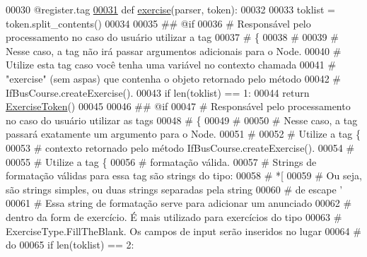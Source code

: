 \begin{DoxyCode}
{{00030 @register.tag
\hypertarget{exercises_8py_source_l00031}{}\hyperlink{namespaceCourse_1_1templatetags_1_1exercises_a8c8aa0687de6cfe821c8acaecafba711}{00031} \textcolor{keyword}{def }\hyperlink{namespaceCourse_1_1templatetags_1_1exercises_a8c8aa0687de6cfe821c8acaecafba711}{exercise}(parser, token):
00032 
00033     toklist = token.split\_contents()
00034 
00035     \textcolor{comment}{## @if}
00036     \textcolor{comment}{#   Responsável pelo processamento no caso do usuário utilizar a tag}
00037     \textcolor{comment}{# \{%
00038     \textcolor{comment}{#}
00039     \textcolor{comment}{#   Nesse caso, a tag não irá passar argumentos adicionais para o Node.}
00040     \textcolor{comment}{#   Utilize esta tag caso você tenha uma variável no contexto chamada}
00041     \textcolor{comment}{#   "exercise" (sem aspas) que contenha o objeto retornado pelo método}
00042     \textcolor{comment}{#   IfBusCourse.createExercise().}
00043     \textcolor{keywordflow}{if} len(toklist) == 1:
00044         \textcolor{keywordflow}{return} \hyperlink{classCourse_1_1templatetags_1_1exercises_1_1ExerciseToken}{ExerciseToken}()
00045 
00046     \textcolor{comment}{## @if}
00047     \textcolor{comment}{#   Responsável pelo processamento no caso do usuário utilizar as tags}
00048     \textcolor{comment}{# \{%
00049     \textcolor{comment}{#}
00050     \textcolor{comment}{#   Nesse caso, a tag passará exatamente um argumento para o Node.}
00051     \textcolor{comment}{#}
00052     \textcolor{comment}{#   Utilize a tag \{%
00053     \textcolor{comment}{# contexto retornado pelo método IfBusCourse.createExercise().}
00054     \textcolor{comment}{#}
00055     \textcolor{comment}{#   Utilize a tag \{%
00056     \textcolor{comment}{# formatação válida.}
00057     \textcolor{comment}{#   Strings de formatação válidas para essa tag são strings do tipo:}
00058     \textcolor{comment}{#       *[%
00059     \textcolor{comment}{#   Ou seja, são strings simples, ou duas strings separadas pela string}
00060     \textcolor{comment}{# de escape '%
00061     \textcolor{comment}{#   Essa string de formatação serve para adicionar um anunciado}
00062     \textcolor{comment}{# dentro da form de exercício. É mais utilizado para exercícios do tipo}
00063     \textcolor{comment}{# ExerciseType.FillTheBlank. Os campos de input serão inseridos no lugar}
00064     \textcolor{comment}{# do %
00065     \textcolor{keywordflow}{if} len(toklist) == 2:
}}}}}}}}}
\end{DoxyCode}

